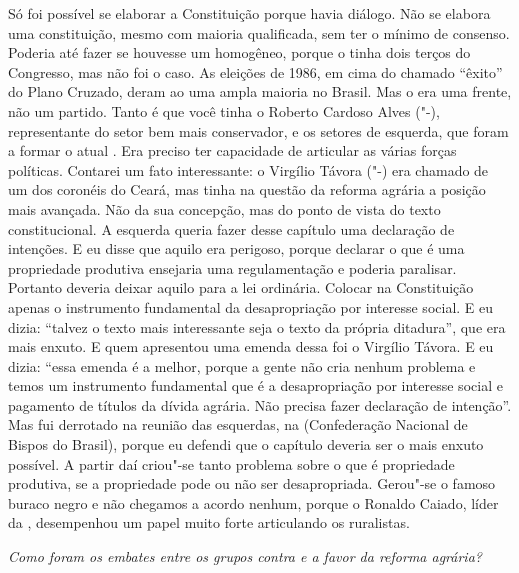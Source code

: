 Só foi possível se elaborar a Constituição porque havia
diálogo. Não se elabora uma constituição, mesmo com maioria qualificada,
sem ter o mínimo de consenso. Poderia até fazer se houvesse um 
homogêneo, porque o  tinha dois terços do Congresso, mas não foi o
caso. As eleições de 1986, em cima do chamado ``êxito'' do Plano
Cruzado, deram ao  uma ampla maioria no Brasil. Mas o  era uma
frente, não um partido. Tanto é que você tinha o Roberto Cardoso Alves
("-), representante do setor bem mais conservador, e os setores de
esquerda, que foram a formar o atual . Era preciso ter capacidade de
articular as várias forças políticas. Contarei um fato interessante: o
Virgílio Távora ("-) era chamado de um dos coronéis do Ceará, mas
tinha na questão da reforma agrária a posição mais avançada. Não da sua
concepção, mas do ponto de vista do texto constitucional. A esquerda
queria fazer desse capítulo uma declaração de intenções. E eu disse que
aquilo era perigoso, porque declarar o que é uma propriedade produtiva
ensejaria uma regulamentação e poderia paralisar. Portanto deveria
deixar aquilo para a lei ordinária. Colocar na Constituição apenas o
instrumento fundamental da desapropriação por interesse social. E eu
dizia: ``talvez o texto mais interessante seja o texto da própria
ditadura'', que era mais enxuto. E quem apresentou uma emenda dessa foi
o Virgílio Távora. E eu dizia: ``essa emenda é a melhor, porque a gente
não cria nenhum problema e temos um instrumento fundamental que é a
desapropriação por interesse social e pagamento de títulos da dívida
agrária. Não precisa fazer declaração de intenção''. Mas fui derrotado
na reunião das esquerdas, na  (Confederação Nacional de Bispos do
Brasil), porque eu defendi que o capítulo deveria ser o mais enxuto
possível. A partir daí criou"-se tanto problema sobre o que é propriedade
produtiva, se a propriedade pode ou não ser desapropriada. Gerou"-se o
famoso buraco negro e não chegamos a acordo nenhum, porque o Ronaldo
Caiado, líder da , desempenhou um papel muito forte articulando os
ruralistas.

\medskip

\emph{Como foram os embates entre os grupos contra e a favor da
reforma agrária?}

